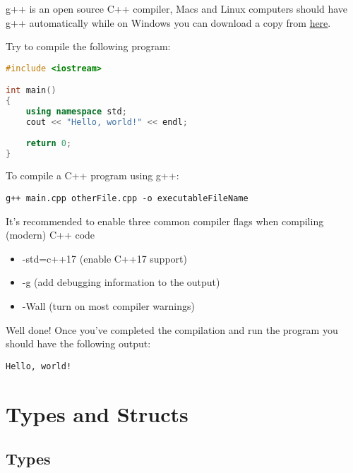 \documentclass[]{article}
\begin{document}
\begin{minipage}{\linewidth}
\begin{exercise}
g++ is an open source C++ compiler, Macs and Linux computers should have g++ automatically while on Windows you can download a copy from \href{https://www.cs.odu.edu/~zeil/cs250PreTest/latest/Public/installingACompiler/#installing-the-cygwin-compiler}{here}.

Try to compile the following program:
\begin{lstlisting}[language=C++]
#include <iostream>

int main()
{
    using namespace std;
    cout << "Hello, world!" << endl;
    
    return 0;
}
\end{lstlisting}

To compile a C++ program using g++:
\begin{lstlisting}[numbers=none]
    g++ main.cpp otherFile.cpp -o executableFileName
\end{lstlisting}

It's recommended to enable three common compiler flags when compiling (modern) C++ code
\begin{itemize}
    \item -std=c++17 (enable C++17 support)
    \item -g (add debugging information to the output)
    \item -Wall (turn on most compiler warnings)
\end{itemize}
\end{exercise}
\begin{solution}
    Well done! Once you've completed the compilation and run the program you should have the following output:
    \begin{lstlisting}[numbers=none]
Hello, world!
    \end{lstlisting}
\end{solution}
\end{minipage}



\section{Types and Structs}
\subsection{Types}
\end{document}
